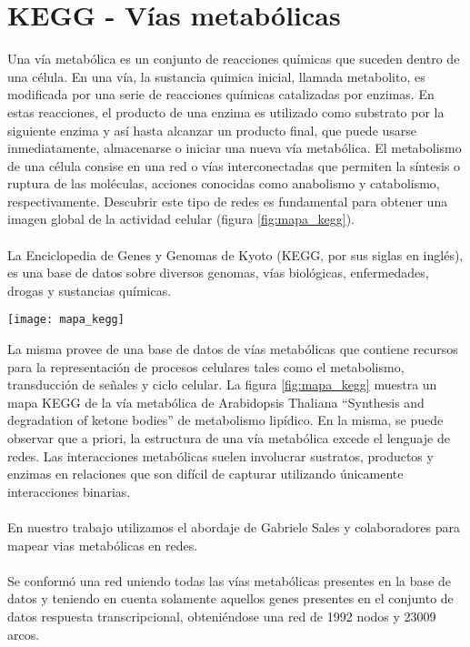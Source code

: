 \section{KEGG - Vías metabólicas}
\label{sec:kegg}
Una vía metabólica es un conjunto de reacciones químicas que suceden dentro de una célula. En una vía, la sustancia quimica inicial, llamada metabolito, es modificada por una serie de reacciones químicas catalizadas por enzimas. En estas reacciones, el producto de una enzima es utilizado como substrato por la siguiente enzima y así hasta alcanzar un producto final, que puede usarse inmediatamente, almacenarse o iniciar una nueva vía metabólica. El metabolismo de una célula consise en una red o vías interconectadas que permiten la síntesis o ruptura de las moléculas, acciones conocidas como anabolismo y catabolismo, respectivamente. Descubrir este tipo de redes es fundamental para obtener una imagen global de la actividad celular (figura \ref{fig:mapa_kegg}).\\\\
La Enciclopedia de Genes y Genomas de Kyoto (KEGG, por sus siglas en inglés), es una base de datos sobre diversos genomas, vías biológicas, enfermedades, drogas y sustancias químicas.
\begin{center}
    \texttt{[image: mapa\_kegg]}
    \label{fig:mapa_kegg}
\end{center}
La misma provee de una base de datos de vías metabólicas que contiene recursos para la representación de procesos celulares tales como el metabolismo, transducción de señales y ciclo celular. La figura \ref{fig:mapa_kegg} muestra un mapa KEGG de la vía metabólica de Arabidopsis Thaliana ``Synthesis and degradation of ketone bodies'' de metabolismo lipídico. En la misma, se puede observar que a priori, la estructura de una vía metabólica excede el lenguaje de redes. Las interacciones metabólicas suelen involucrar sustratos, productos y enzimas en relaciones que son difícil de capturar utilizando únicamente interacciones binarias.\\\\
En nuestro trabajo utilizamos el abordaje de Gabriele Sales y colaboradores \cite{Graphite2015} para mapear vias metabólicas en redes.\\\\
Se conformó una red uniendo todas las vías metabólicas presentes en la base de datos y teniendo en cuenta solamente aquellos genes presentes en el conjunto de datos respuesta transcripcional, obteniéndose una red de 1992 nodos y 23009 arcos.
\cite{Segal2003, Kanehisa2000}
